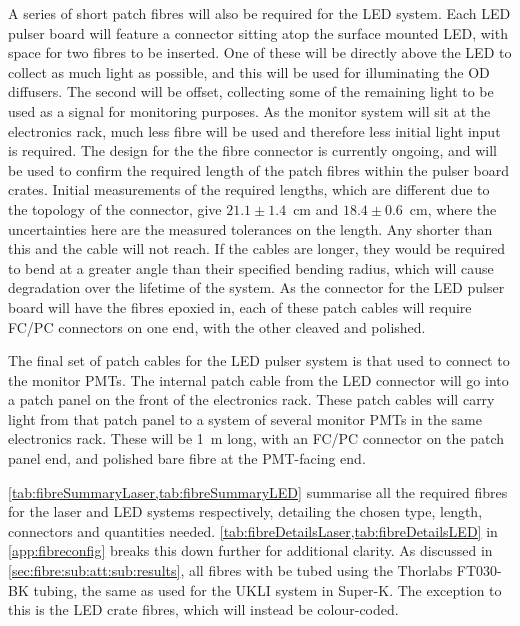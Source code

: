 \documentclass[a4paper,11pt]{article}
\begin{document}
A series of short patch fibres will also be required for the LED system. Each LED pulser board will feature a connector sitting atop the surface mounted LED, with space for two fibres to be inserted. One of these will be directly above the LED to collect as much light as possible, and this will be used for illuminating the OD diffusers. The second will be offset, collecting some of the remaining light to be used as a signal for monitoring purposes. As the monitor system will sit at the electronics rack, much less fibre will be used and therefore less initial light input is required. The design for the the fibre connector is currently ongoing, and will be used to confirm the required length of the patch fibres within the pulser board crates. Initial measurements of the required lengths, which are different due to the topology of the connector, give $21.1\pm1.4$~cm and $18.4\pm0.6$~cm, where the uncertainties here are the measured tolerances on the length. Any shorter than this and the cable will not reach. If the cables are longer, they would be required to bend at a greater angle than their specified bending radius, which will cause degradation over the lifetime of the system. As the connector for the LED pulser board will have the fibres epoxied in, each of these patch cables will require FC/PC connectors on one end, with the other cleaved and polished.

The final set of patch cables for the LED pulser system is that used to connect to the monitor PMTs. The internal patch cable from the LED connector will go into a patch panel on the front of the electronics rack. These patch cables will carry light from that patch panel to a system of several monitor PMTs in the same electronics rack. These will be 1~m long, with an FC/PC connector on the patch panel end, and polished bare fibre at the PMT-facing end.

\cref{tab:fibreSummaryLaser,tab:fibreSummaryLED} summarise all the required fibres for the laser and LED systems respectively, detailing the chosen type, length, connectors and quantities needed. \cref{tab:fibreDetailsLaser,tab:fibreDetailsLED} in \cref{app:fibreconfig} breaks this down further for additional clarity. As discussed in \cref{sec:fibre:sub:att:sub:results}, all fibres with be tubed using the Thorlabs FT030-BK tubing, the same as used for the UKLI system in Super-K. The exception to this is the LED crate fibres, which will instead be colour-coded.
\end{document}
